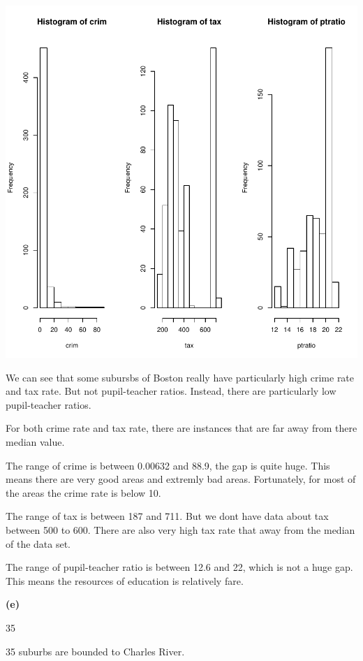 \documentclass[a4paper]{article}
\renewcommand{\part}[1] {\vspace{.10in} {\bf (#1)}}
\begin{document}
\includegraphics{lm-hist}
\begin{enumerate}
{\color{red}
\item We can see that some subursbs of Boston really have particularly high crime rate and tax rate. But not pupil-teacher ratios. Instead, there are particularly low pupil-teacher ratios.
\item For both crime rate and tax rate, there are instances that are far away from there median value.
\item The range of crime is between 0.00632 and 88.9, the gap is quite huge. This means there are very good areas and extremly bad areas. Fortunately, for most of the areas the crime rate is below 10.
\item The range of tax is between 187 and 711. But we dont have data about tax between 500 to 600. There are also very high tax rate that away from the median of the data set.
\item The range of pupil-teacher ratio is between 12.6 and 22, which is not a huge gap. This means the resources of education is relatively fare.
}
\end{enumerate}


\part{e}
\begin{Schunk}
\begin{Soutput}
[1] 35
\end{Soutput}
\end{Schunk}
{\color{red}
35 suburbs are bounded to Charles River.}
\end{document}
